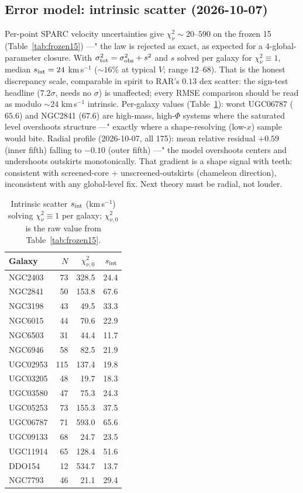 \documentclass[twocolumn]{aastex631}
\begin{document}
\subsection{Error model: intrinsic scatter (2026-10-07)}
Per-point SPARC velocity uncertainties give $\chi^{2}_{\nu}\sim20$--$590$ on the frozen 15 (Table~\ref{tab:frozen15}) ---" the law is rejected as exact, as expected for a 4-global-parameter closure. With $\sigma_{\rm tot}^{2}=\sigma_{\rm obs}^{2}+s^{2}$ and $s$ solved per galaxy for $\chi^{2}_{\nu}\equiv1$, median $s_{\rm int}=24$ km\,s$^{-1}$ ($\sim16\%$ at typical $V$; range $12$--$68$). That is the honest discrepancy scale, comparable in spirit to RAR's $0.13$ dex scatter: the sign-test headline ($7.2\sigma$, needs no $\sigma$) is unaffected; every RMSE comparison should be read as modulo $\sim24$ km\,s$^{-1}$ intrinsic. Per-galaxy values (Table~\ref{tab:sint}): worst UGC06787 ($65.6$) and NGC2841 ($67.6$) are high-mass, high-$\Phi$ systems where the saturated level overshoots structure ---" exactly where a shape-resolving (low-$x$) sample would bite. Radial profile (2026-10-07, all 175): mean relative residual $+0.59$ (inner fifth) falling to $-0.10$ (outer fifth) ---" the model overshoots centers and undershoots outskirts monotonically. That gradient is a shape signal with teeth: consistent with screened-core + unscreened-outskirts (chameleon direction), inconsistent with any global-level fix. Next theory must be radial, not louder.
\begin{table}[h]
\centering
\caption{Intrinsic scatter $s_{\rm int}$ (km\,s$^{-1}$) solving $\chi^{2}_{\nu}\equiv1$ per galaxy; $\chi^{2}_{\nu,0}$ is the raw value from Table~\ref{tab:frozen15}.}
\label{tab:sint}
\begin{tabular}{lrrr}
\toprule
Galaxy & $N$ & $\chi^2_{\nu,0}$ & $s_{\rm int}$ \\
\midrule
NGC2403 & 73 & 328.5 & 24.4 \\
NGC2841 & 50 & 153.8 & 67.6 \\
NGC3198 & 43 & 49.5 & 33.3 \\
NGC6015 & 44 & 70.6 & 22.9 \\
NGC6503 & 31 & 44.4 & 11.7 \\
NGC6946 & 58 & 82.5 & 21.9 \\
UGC02953 & 115 & 137.4 & 19.8 \\
UGC03205 & 48 & 19.7 & 18.3 \\
UGC03580 & 47 & 75.3 & 24.3 \\
UGC05253 & 73 & 155.3 & 37.5 \\
UGC06787 & 71 & 593.0 & 65.6 \\
UGC09133 & 68 & 24.7 & 23.5 \\
UGC11914 & 65 & 128.4 & 51.6 \\
DDO154 & 12 & 534.7 & 13.7 \\
NGC7793 & 46 & 21.1 & 29.4 \\
\bottomrule
\end{tabular}
\end{table}
\end{document}
